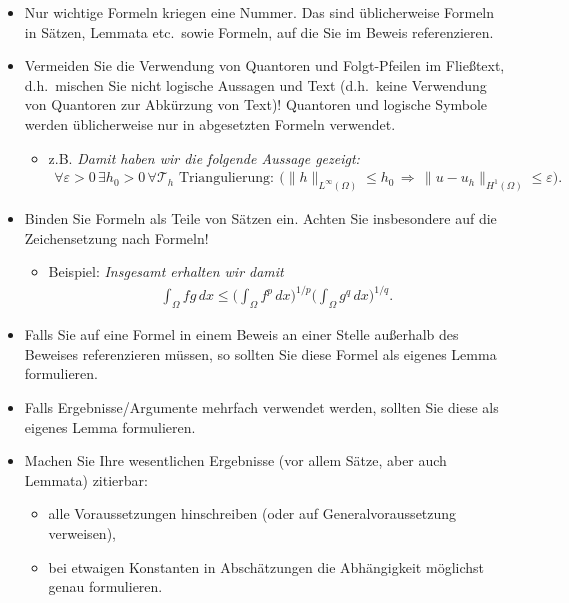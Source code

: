 {\begin{itemize}
\item Nur wichtige Formeln kriegen eine Nummer. Das sind üblicherweise Formeln in Sät\-zen, Lemmata etc.\ sowie Formeln, auf die Sie im Beweis referenzieren.

\item Vermeiden Sie die Verwendung von Quantoren und Folgt-Pfeilen im Fließtext, d.h.\ mischen Sie nicht logische Aussagen und Text (d.h.\ keine Verwendung von Quantoren zur Abkürzung von Text)! Quantoren und logische Symbole werden üblicherweise nur in abgesetzten Formeln verwendet. 
\begin{itemize}
\item z.B. \emph{Damit haben wir die folgende Aussage gezeigt:
\begin{align*}
 \forall \varepsilon > 0 \, \exists h_0 > 0 \, \forall \mathcal{T}_h\text{ Triangulierung}:
 \ \Big( \| h \|_{L^\infty(\Omega)} \le h_0
 \, \Longrightarrow \,
 \| u - u_h \|_{H^1(\Omega)} \le \varepsilon \Big).
\end{align*}}
\end{itemize}

\item Binden Sie Formeln als Teile von Sätzen ein. Achten Sie insbesondere auf die Zeichensetzung nach Formeln!
\begin{itemize}
\item Beispiel: \emph{Insgesamt erhalten wir damit
\begin{align*}
 \int_\Omega fg\,dx 
 \le \bigg(\int_\Omega f^p \, dx\bigg)^{1/p} \bigg(\int_\Omega g^q \, dx\bigg)^{1/q}.
\end{align*}}
\end{itemize}

\item Falls Sie auf eine Formel in einem Beweis an einer Stelle außerhalb des Beweises referenzieren müssen, so sollten Sie diese Formel als eigenes Lemma formulieren.

\item Falls Ergebnisse/Argumente mehrfach verwendet werden, sollten Sie diese als eigenes Lemma formulieren.

\item Machen Sie Ihre wesentlichen Ergebnisse (vor allem Sätze, aber auch Lemmata) zitierbar:
\begin{itemize}
\item alle Voraussetzungen hinschreiben (oder auf Generalvoraussetzung verweisen),
\item bei etwaigen Konstanten in Abschätzungen die Abhängigkeit möglichst genau formulieren.
\end{itemize}

\end{itemize}
}

